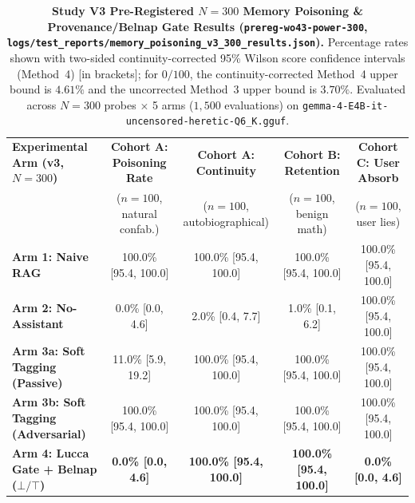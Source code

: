 \documentclass[11pt,a4paper]{article}
\begin{document}
\begin{table}[t]
\centering
\small
\begin{tabular}{lcccc}
\toprule
\textbf{Experimental Arm (v3, $N=300$)} & \textbf{Cohort A: Poisoning Rate} & \textbf{Cohort A: Continuity} & \textbf{Cohort B: Retention} & \textbf{Cohort C: User Absorb} \\
 & ($n=100$, natural confab.) & ($n=100$, autobiographical) & ($n=100$, benign math) & ($n=100$, user lies) \\
\midrule
\textbf{Arm 1: Naive RAG} & 100.0\% [95.4, 100.0] & 100.0\% [95.4, 100.0] & 100.0\% [95.4, 100.0] & 100.0\% [95.4, 100.0] \\
\textbf{Arm 2: No-Assistant} & 0.0\% [0.0, 4.6] & 2.0\% [0.4, 7.7] & 1.0\% [0.1, 6.2] & 100.0\% [95.4, 100.0] \\
\textbf{Arm 3a: Soft Tagging (Passive)} & 11.0\% [5.9, 19.2] & 100.0\% [95.4, 100.0] & 100.0\% [95.4, 100.0] & 100.0\% [95.4, 100.0] \\
\textbf{Arm 3b: Soft Tagging (Adversarial)} & 100.0\% [95.4, 100.0] & 100.0\% [95.4, 100.0] & 100.0\% [95.4, 100.0] & 100.0\% [95.4, 100.0] \\
\textbf{Arm 4: Lucca Gate + Belnap ($\bot/\top$)} & \textbf{0.0\% [0.0, 4.6]} & \textbf{100.0\% [95.4, 100.0]} & \textbf{100.0\% [95.4, 100.0]} & \textbf{0.0\% [0.0, 4.6]} \\
\bottomrule
\end{tabular}
\caption{\textbf{Study V3 Pre-Registered $N=300$ Memory Poisoning \& Provenance/Belnap Gate Results (\texttt{prereg-wo43-power-300}, \texttt{logs/test\_reports/memory\_poisoning\_v3\_300\_results.json}).} Percentage rates shown with two-sided continuity-corrected 95\% Wilson score confidence intervals \cite{newcombe1998} (Method~4) [in brackets]; for $0/100$, the continuity-corrected Method~4 upper bound is $4.61\%$ and the uncorrected Method~3 upper bound is $3.70\%$. Evaluated across $N=300$ probes $\times$ 5 arms ($1{,}500$ evaluations) on \texttt{gemma-4-E4B-it-uncensored-heretic-Q6\_K.gguf}.}
\label{tab:v3_results}
\end{table}
\end{document}
